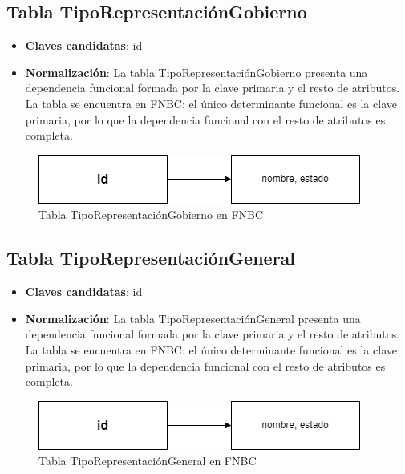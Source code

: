 \subsection{Tabla TipoRepresentaciónGobierno}
    \begin{itemize}
        \item \textbf{Claves candidatas}: id
        \item \textbf{Normalización}: La tabla TipoRepresentaciónGobierno presenta una dependencia funcional formada por la clave primaria y el resto de atributos. La tabla se encuentra en FNBC: el único determinante funcional es la clave primaria, por lo que la dependencia funcional con el resto de atributos es completa.
    \end{itemize}

\begin{figure}[H]
\centering
\includegraphics[scale=0.75]{img/diagramas/Datos/FNBC-TipoRepresentaciónGobierno.png}
\caption{Tabla TipoRepresentaciónGobierno en FNBC}\label{fig:Tabla TipoRepresentaciónGobierno en FNBC}   
\end{figure}

\subsection{Tabla TipoRepresentaciónGeneral}
    \begin{itemize}
        \item \textbf{Claves candidatas}: id
        \item \textbf{Normalización}: La tabla TipoRepresentaciónGeneral presenta una dependencia funcional formada por la clave primaria y el resto de atributos. La tabla se encuentra en FNBC: el único determinante funcional es la clave primaria, por lo que la dependencia funcional con el resto de atributos es completa.
    \end{itemize}

\begin{figure}[H]
\centering
\includegraphics[scale=0.75]{img/diagramas/Datos/FNBC-TipoRepresentaciónGeneral.png}
\caption{Tabla TipoRepresentaciónGeneral en FNBC}\label{fig:Tabla TipoRepresentaciónGeneral en FNBC}   
\end{figure}


